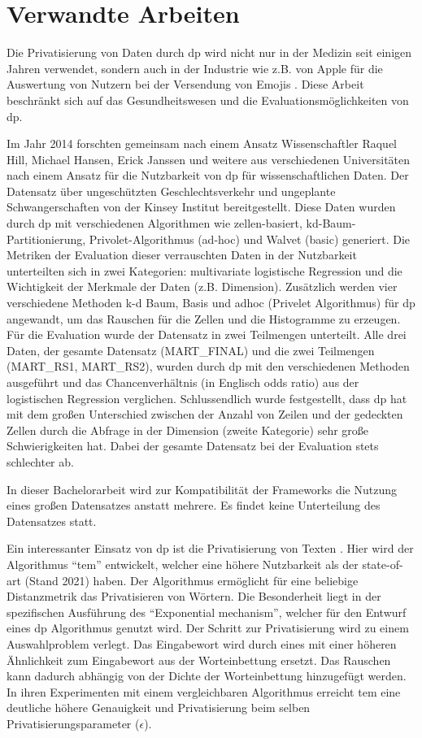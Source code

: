 \chapter{Verwandte Arbeiten}
Die Privatisierung von Daten durch \gls{dp} wird nicht nur in der Medizin seit einigen Jahren verwendet, sondern auch in der Industrie wie z.B. von Apple für die Auswertung von Nutzern bei der Versendung von Emojis \parencite{Apple}. Diese Arbeit beschränkt sich auf das Gesundheitswesen und die Evaluationsmöglichkeiten von \gls{dp}.


Im Jahr 2014 forschten gemeinsam nach einem Ansatz Wissenschaftler Raquel Hill, Michael Hansen, Erick Janssen und weitere aus verschiedenen Universitäten \parencite{Hill2014} nach einem Ansatz für die Nutzbarkeit von \gls{dp} für wissenschaftlichen Daten. Der Datensatz über ungeschützten Geschlechtsverkehr und ungeplante Schwangerschaften von der Kinsey Institut bereitgestellt. Diese Daten wurden durch \gls{dp} mit verschiedenen Algorithmen wie zellen-basiert, kd-Baum-Partitionierung, Privolet-Algorithmus (ad-hoc) und Walvet (basic) generiert. Die Metriken der Evaluation dieser verrauschten Daten in der Nutzbarkeit unterteilten sich in zwei Kategorien: multivariate logistische Regression und die Wichtigkeit der Merkmale der Daten (z.B. Dimension). 
Zusätzlich werden vier verschiedene Methoden k-d Baum, Basis und adhoc (Privelet Algorithmus) für \gls{dp} angewandt, um das Rauschen für die Zellen und die Histogramme zu erzeugen.
Für die Evaluation wurde der Datensatz in zwei Teilmengen unterteilt. Alle drei Daten, der gesamte Datensatz (MART\_FINAL) und die zwei Teilmengen (MART\_RS1, MART\_RS2), wurden durch \gls{dp} mit den verschiedenen Methoden ausgeführt und das Chancenverhältnis (in Englisch odds ratio) aus der logistischen Regression verglichen. Schlussendlich wurde festgestellt, dass \gls{dp} hat mit dem großen Unterschied zwischen der Anzahl von Zeilen und der gedeckten Zellen durch die Abfrage in der Dimension (zweite Kategorie) sehr große Schwierigkeiten hat. Dabei der gesamte Datensatz bei der Evaluation stets schlechter ab. 

In dieser Bachelorarbeit wird zur Kompatibilität der Frameworks die Nutzung eines großen Datensatzes anstatt mehrere. Es findet keine Unterteilung des Datensatzes statt.

Ein interessanter Einsatz von \gls{dp} ist die Privatisierung von Texten \parencite{TEM2021}. Hier wird der Algorithmus \enquote{\gls{tem}} entwickelt, welcher eine höhere Nutzbarkeit als der state-of-art (Stand 2021) haben. Der Algorithmus ermöglicht für eine beliebige Distanzmetrik das Privatisieren von Wörtern. Die Besonderheit liegt in der spezifischen Ausführung des \enquote{Exponential mechanism}, welcher für den Entwurf eines \gls{dp} Algorithmus genutzt wird. Der Schritt zur Privatisierung wird zu einem Auswahlproblem verlegt. Das Eingabewort wird durch eines mit einer höheren Ähnlichkeit zum Eingabewort aus der Worteinbettung ersetzt. Das Rauschen kann dadurch abhängig von der Dichte der Worteinbettung hinzugefügt werden. In ihren Experimenten mit einem vergleichbaren Algorithmus erreicht \gls{tem} eine deutliche höhere Genauigkeit und Privatisierung beim selben Privatisierungsparameter ($\epsilon$).


